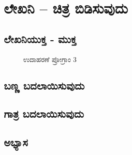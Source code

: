 \chapter{ಲೇಖನಿ – ಚಿತ್ರ ಬಿಡಿಸುವುದು}

\section{ಲೇಖನಿಯುಕ್ತ - ಮುಕ್ತ}
\begin{figure}[h]
\begin{Scratch}[1]
\beginbox{}
\end{Scratch}
\caption{ಉದಾಹರಣೆ ಪ್ರೋಗ್ರಾಂ 3}
\end{figure}

\section{ಬಣ್ಣ ಬದಲಾಯಿಸುವುದು}

\section{ಗಾತ್ರ ಬದಲಾಯಿಸುವುದು}

\section{ಅಭ್ಯಾಸ }